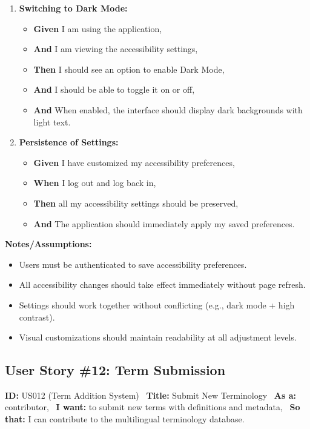 \documentclass[12pt]{article}
\begin{document}
\begin{enumerate}
    \item \textbf{Switching to Dark Mode:}
    \begin{itemize}
        \item \textbf{Given} I am using the application,
        \item \textbf{And} I am viewing the accessibility settings,
        \item \textbf{Then} I should see an option to enable Dark Mode,
        \item \textbf{And} I should be able to toggle it on or off,
        \item \textbf{And} When enabled, the interface should display dark backgrounds with light text.
    \end{itemize}

    \item \textbf{Persistence of Settings:}
    \begin{itemize}
        \item \textbf{Given} I have customized my accessibility preferences,
        \item \textbf{When} I log out and log back in,
        \item \textbf{Then} all my accessibility settings should be preserved,
        \item \textbf{And} The application should immediately apply my saved preferences.
    \end{itemize}
\end{enumerate}

\vspace{1em}
\textbf{Notes/Assumptions:}
\begin{itemize}
    \item Users must be authenticated to save accessibility preferences.
    \item All accessibility changes should take effect immediately without page refresh.
    \item Settings should work together without conflicting (e.g., dark mode + high contrast).
    \item Visual customizations should maintain readability at all adjustment levels.
\end{itemize}

\subsection{User Story \#12: Term Submission}
\textbf{ID:} US012 (Term Addition System) \
\textbf{Title:} Submit New Terminology \
\textbf{As a:} contributor, \
\textbf{I want:} to submit new terms with definitions and metadata, \
\textbf{So that:} I can contribute to the multilingual terminology database.
\end{document}
